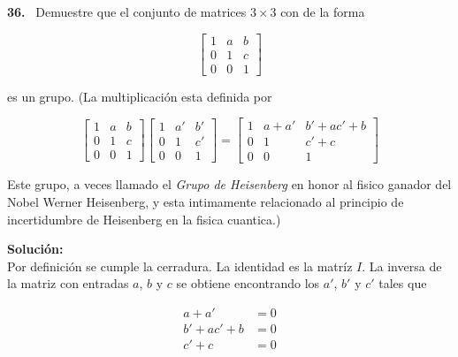 \documentclass{article}
\newcounter{problem}
\newcounter{solution}
\newcommand\Problem[1]{%
  \stepcounter{problem}%
  \textbf{#1.}~%
  \setcounter{solution}{0}%
}
\newcommand\TheSolution{%
  \textbf{Solución:}\\%
}
\begin{document}
\Problem{36} Demuestre que el conjunto de matrices $3 \times 3$ con de la
forma

\[
\begin{bmatrix}
    1  &  a & b    \\
    0  &  1 & c \\
    0  &  0 & 1
\end{bmatrix}
\]

es un grupo. (La multiplicación esta definida por

\[
\begin{bmatrix}
    1  &  a & b    \\
    0  &  1 & c \\
    0  &  0 & 1
\end{bmatrix}
\begin{bmatrix}
    1  &  a' & b'    \\
    0  &  1 & c' \\
    0  &  0 & 1
\end{bmatrix}
=
\begin{bmatrix}
    1  &  a + a' & b' + ac' + b    \\
    0  &  1 & c' + c \\
    0  &  0 & 1
\end{bmatrix}
\]

Este grupo, a veces llamado el \textit{Grupo de Heisenberg} en honor al fisico
ganador del Nobel Werner Heisenberg, y esta intimamente relacionado al
principio de incertidumbre de Heisenberg en la fisica cuantica.)

\TheSolution{} Por definición se cumple la cerradura. La identidad es la
matríz $I$. La inversa de la matriz con entradas $a$, $b$ y $c$ se obtiene
encontrando los $a'$, $b'$ y $c'$ tales que

\[
\begin{split}
  a + a'       & = 0 \\
  b' + ac' + b & = 0 \\
  c' + c       & = 0
\end{split}
\]
\end{document}
